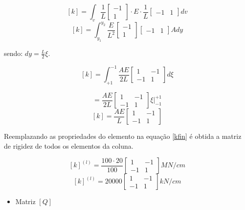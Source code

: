\documentclass{article} %
\begin{document}
 \begin{equation}\label{}
[k]= \int_{v}\frac{1}{L}\begin{bmatrix}
-1  \\
1
\end{bmatrix}\cdot E\cdot \frac{1}{L}\begin{bmatrix}
-1&1
\end{bmatrix}dv
\end{equation}
 \begin{equation*}\label{}
[k]= \int_{y_1}^{y_2}\frac{E}{L^2}\begin{bmatrix}
-1  \\
1
\end{bmatrix}\begin{bmatrix}
-1&1
\end{bmatrix}Ady
\end{equation*}

\indent sendo: \(dy=\frac{L}{2}\xi\).

 \begin{equation*}\label{}
[k]= \int_{+1}^{-1}\frac{AE}{2L}\begin{bmatrix}
1 &-1 \\
-1&1
\end{bmatrix}d\xi
\end{equation*}

 \begin{equation*}
[k]= \frac{AE}{2L}\begin{bmatrix}
1 &-1 \\
-1&1
\end{bmatrix}\xi\biggr|_{-1}^{+1}
\end{equation*}
 \begin{equation}\label{kfin}
[k]= \frac{AE}{L}\begin{bmatrix}
1 &-1 \\
-1&1
\end{bmatrix}
\end{equation}

\indent Reemplazando as propriedades do elemento na equação \ref{kfin} é obtida a matriz de rigidez de todos os elementos da coluna.

 \begin{equation*}\label{}
[k]^{(l)}= \frac{100 \cdot 20}{100}\begin{bmatrix}
1 &-1 \\
-1&1
\end{bmatrix}MN/cm
\end{equation*}
 \begin{equation*}\label{}
[k]^{(l)}= 20000\begin{bmatrix}
1 &-1 \\
-1&1
\end{bmatrix}kN/cm
\end{equation*}
\begin{itemize}
	\item Matriz \([Q]\)
\end{itemize}
\end{document}
